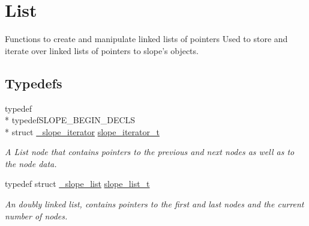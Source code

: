 \hypertarget{group__List}{\section{List}
\label{group__List}
}


Functions to create and manipulate linked lists of pointers Used to store and iterate over linked lists of pointers to slope's objects.  


\subsection*{Typedefs}
\begin{DoxyCompactItemize}
\item 
\hypertarget{group__List_gaad13ce078b8dfe56e5a54bafc9aff9af}{typedef \\*
typedef\+S\+L\+O\+P\+E\+\_\+\+B\+E\+G\+I\+N\+\_\+\+D\+E\+C\+L\+S \\*
struct \hyperlink{struct__slope__iterator}{\+\_\+slope\+\_\+iterator} \hyperlink{group__List_gaad13ce078b8dfe56e5a54bafc9aff9af}{slope\+\_\+iterator\+\_\+t}}\label{group__List_gaad13ce078b8dfe56e5a54bafc9aff9af}

\begin{DoxyCompactList}\small\item\em A List node that contains pointers to the previous and next nodes as well as to the node data. \end{DoxyCompactList}\item 
\hypertarget{group__List_ga88326d377deca937191acac6784bff0e}{typedef struct \hyperlink{struct__slope__list}{\+\_\+slope\+\_\+list} \hyperlink{group__List_ga88326d377deca937191acac6784bff0e}{slope\+\_\+list\+\_\+t}}\label{group__List_ga88326d377deca937191acac6784bff0e}

\begin{DoxyCompactList}\small\item\em An doubly linked list, contains pointers to the first and last nodes and the current number of nodes. \end{DoxyCompactList}\end{DoxyCompactItemize}
